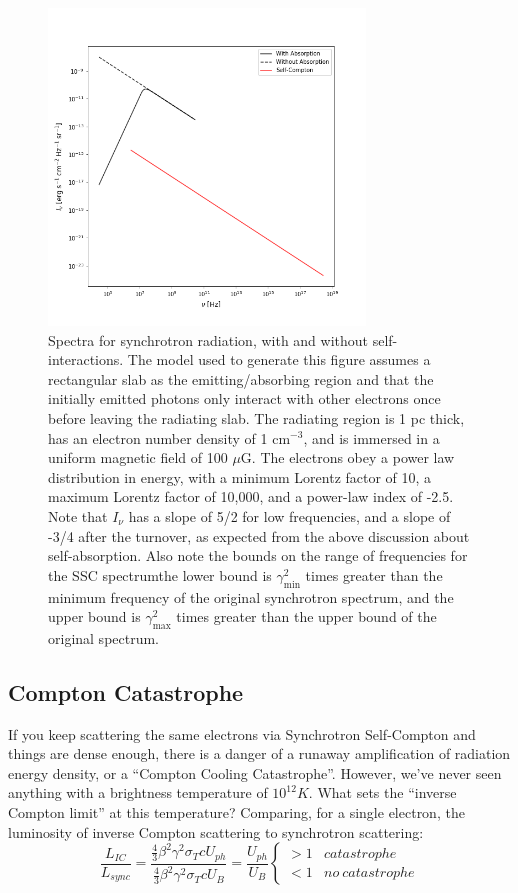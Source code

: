 \documentclass{article}
\begin{document}
\begin{figure}
    \centering
    \includegraphics[width=0.75\textwidth]{figures/Synchrotron_Self_Interaction.png}
    \caption{Spectra for synchrotron radiation, with and without self-interactions. The model used to generate this figure assumes a rectangular slab as the emitting/absorbing region and that the initially emitted photons only interact with other electrons once before leaving the radiating slab. The radiating region is 1 pc thick, has an electron number density of 1 cm$^{-3}$, and is immersed in a uniform magnetic field of 100 $\mu$G. The electrons obey a power law distribution in energy, with a minimum Lorentz factor of 10, a maximum Lorentz factor of 10,000, and a power-law index of -2.5. Note that $I_\nu$ has a slope of 5/2 for low frequencies, and a slope of -3/4 after the turnover, as expected from the above discussion about self-absorption. Also note the bounds on the range of frequencies for the SSC spectrum\textemdash the lower bound is $\gamma_\mathrm{min}^2$ times greater than the minimum frequency of the original synchrotron spectrum, and the upper bound is $\gamma_\mathrm{max}^2$ times greater than the upper bound of the original spectrum.}
    \label{fig:ssc}
\end{figure}

\subsection{ Compton Catastrophe}

\def\gamax{\gamma_{max}}

If you keep scattering the same electrons via Synchrotron Self-Compton and things are dense enough,
there is a danger of a runaway amplification
of radiation energy density, or a ``Compton Cooling Catastrophe''.  However,
we've never seen anything with a brightness temperature of $10^{12}K$.  
What sets the ``inverse Compton limit'' at this temperature?  Comparing,
for a single electron,
the luminosity of inverse Compton scattering to synchrotron scattering:
$$\frac{L_{IC}}{ L_{sync}}=\frac{\frac{4}{3}\beta^2\gamma^2\sigma_TcU_{ph}}{
\frac{4}{3}\beta^2\gamma^2\sigma_TcU_B}=\frac{U_{ph}}{ U_B}
\begin{cases} >1&catastrophe\\ <1 &no\ catastrophe\end{cases}$$
\end{document}
